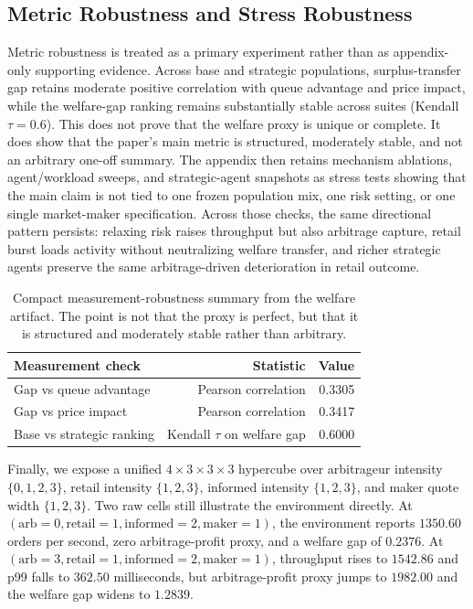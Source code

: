 \documentclass[11pt]{article}
\begin{document}
\subsection{Metric Robustness and Stress Robustness}
Metric robustness is treated as a primary experiment rather than as appendix-only supporting evidence. Across base and strategic populations, surplus-transfer gap retains moderate positive correlation with queue advantage and price impact, while the welfare-gap ranking remains substantially stable across suites (Kendall $\tau=0.6$). This does not prove that the welfare proxy is unique or complete. It does show that the paper's main metric is structured, moderately stable, and not an arbitrary one-off summary. The appendix then retains mechanism ablations, agent/workload sweeps, and strategic-agent snapshots as stress tests showing that the main claim is not tied to one frozen population mix, one risk setting, or one single market-maker specification. Across those checks, the same directional pattern persists: relaxing risk raises throughput but also arbitrage capture, retail burst loads activity without neutralizing welfare transfer, and richer strategic agents preserve the same arbitrage-driven deterioration in retail outcome.

\begin{table}[t]
\centering
\begin{tabular}{lrr}
\toprule
Measurement check & Statistic & Value \\
\midrule
Gap vs queue advantage & Pearson correlation & 0.3305 \\
Gap vs price impact & Pearson correlation & 0.3417 \\
Base vs strategic ranking & Kendall $\tau$ on welfare gap & 0.6000 \\
\bottomrule
\end{tabular}
\caption{Compact measurement-robustness summary from the welfare artifact. The point is not that the proxy is perfect, but that it is structured and moderately stable rather than arbitrary.}
\end{table}

Finally, we expose a unified $4 \times 3 \times 3 \times 3$ hypercube over arbitrageur intensity $\{0,1,2,3\}$, retail intensity $\{1,2,3\}$, informed intensity $\{1,2,3\}$, and maker quote width $\{1,2,3\}$. Two raw cells still illustrate the environment directly. At $(\text{arb}=0,\text{retail}=1,\text{informed}=2,\text{maker}=1)$, the environment reports $1350.60$ orders per second, zero arbitrage-profit proxy, and a welfare gap of $0.2376$. At $(\text{arb}=3,\text{retail}=1,\text{informed}=2,\text{maker}=1)$, throughput rises to $1542.86$ and p99 falls to $362.50$ milliseconds, but arbitrage-profit proxy jumps to $1982.00$ and the welfare gap widens to $1.2839$.
\end{document}
